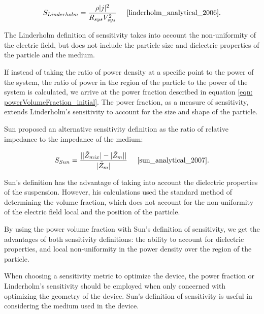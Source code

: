 \begin{equation}
    S_{Linderholm} = \frac{\rho |j|^2}{R_{sys}V_{sys}^2} \;\;\;\;\;\cite{linderholm_analytical_2006}.
    \label{eqn:Linderholtz}
\end{equation}

\noindent The Linderholm definition of sensitivity takes into account the non-uniformity of the electric field, but does not include the particle size and dielectric properties of the particle and the medium.

\par If instead of taking the ratio of power density at a specific point to the power of the system, the ratio of power in the region of the particle to the power of the system is calculated, we arrive at the power fraction described in equation \ref{eqn: powerVolumeFraction_initial}. The power fraction, as a measure of sensitivity, extends Linderholm's sensitivity to account for the size and shape of the particle.

\par Sun proposed an alternative sensitivity definition as the ratio of relative impedance to the impedance of the medium:

\begin{equation}
    S_{Sun} = \frac{| |\Tilde{Z}_{mix}| - |\Tilde{Z}_m| |}{|\Tilde{Z}_m|} \;\;\;\;\; \cite{sun_analytical_2007}.
    \label{eqn:Sun_sensitivity}
\end{equation}

\par Sun's definition has the advantage of taking into account the dielectric properties of the suspension. However, his calculations used the standard method of determining the volume fraction, which does not account for the non-uniformity of the electric field local and the position of the particle. 

\par By using the power volume fraction with Sun's definition of sensitivity, we get the advantages of both sensitivity definitions: the ability to account for dielectric properties, and local non-uniformity in the power density over the region of the particle.

\par When choosing a sensitivity metric to optimize the device, the power fraction or Linderholm's sensitivity should be employed when only concerned with optimizing the geometry of the device. Sun's definition of sensitivity is useful in considering the medium used in the device.



